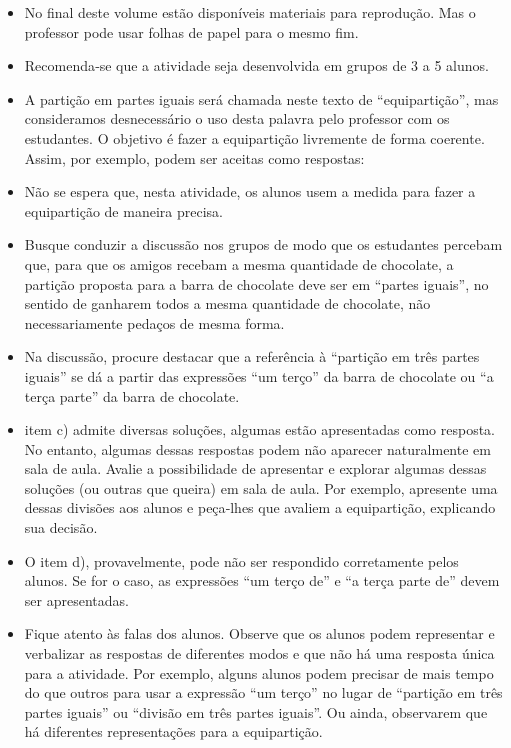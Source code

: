 \documentclass[10 pt,usenames,dvipsnames, oneside]{article}
\begin{document}
\begin{goals}
\begin{itemize}
\item No final deste volume estão disponíveis materiais para
reprodução. Mas o professor pode usar folhas de papel
para o mesmo fim.
\item Recomenda‐se que a atividade seja desenvolvida em
grupos de 3 a 5 alunos.
\item A partição em partes iguais será chamada neste texto
de “equipartição”, mas consideramos desnecessário o
uso desta palavra pelo professor com os estudantes. O
objetivo é fazer a equipartição livremente de forma coerente.
Assim, por exemplo, podem ser aceitas como
respostas:
\begin{center}
\end{center}
\item Não se espera que, nesta atividade, os alunos usem a
medida para fazer a equipartição de maneira precisa.
\item Busque conduzir a discussão nos grupos de modo que
os estudantes percebam que, para que os amigos recebam
a mesma quantidade de chocolate, a partição proposta
para a barra de chocolate deve ser em “partes
iguais”, no sentido de ganharem todos a mesma quantidade
de chocolate, não necessariamente pedaços de
mesma forma.
\item Na discussão, procure destacar que a referência à
“partição em três partes iguais” se dá a partir das expressões
“um terço” da barra de chocolate ou “a terça
parte” da barra de chocolate.
\item item c) admite diversas soluções, algumas estão
apresentadas como resposta. No entanto, algumas dessas
respostas podem não aparecer naturalmente em sala
de aula. Avalie a possibilidade de apresentar e explorar
algumas dessas soluções (ou outras que queira) em sala
de aula. Por exemplo, apresente uma dessas divisões
aos alunos e peça‐lhes que avaliem a equipartição, explicando
sua decisão.
\item O item d), provavelmente, pode não ser respondido corretamente pelos alunos. Se for o caso, as expressões ``um terço de'' e ``a terça parte de'' devem ser apresentadas.
\item Fique atento às falas dos alunos. Observe que os alunos podem representar e verbalizar as respostas de diferentes modos e que não há uma resposta única para a atividade. Por exemplo, alguns alunos podem precisar de mais tempo do que outros para usar a expressão       ``um terço'' no lugar de       ``partição em três partes iguais'' ou ``divisão em três partes iguais''. Ou ainda, observarem que há diferentes representações para a equipartição.

\end{itemize}
\end{goals}
\end{document}
